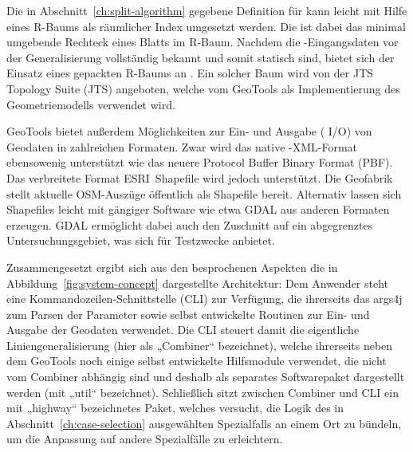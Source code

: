\documentclass[../main/thesis.tex]{subfiles}
\begin{document}
Die in Abschnitt~\ref{ch:split-algorithm} gegebene Definition für  kann leicht mit Hilfe eines R-Baums als räumlicher Index umgesetzt werden.
Die  ist dabei das minimal umgebende Rechteck eines Blatts im R-Baum.
Nachdem die \osm-Eingangsdaten vor der Generalisierung vollständig bekannt und somit statisch sind, bietet sich der Einsatz eines gepackten R-Baums an .
Ein solcher Baum wird von der JTS Topology Suite (JTS) angeboten, welche vom  GeoTools als Implementierung des Geometriemodells verwendet wird.

GeoTools bietet außerdem Möglichkeiten zur Ein- und Ausgabe ( I/O) von Geodaten in zahlreichen Formaten.
Zwar wird das native \osm-XML-Format ebensowenig unterstützt wie das neuere Protocol Buffer Binary Format (PBF).
Das verbreitete Format ESRI~Shapefile wird jedoch unterstützt.
Die Geofabrik stellt aktuelle OSM-Auszüge öffentlich als Shapefile bereit.
Alternativ lassen sich Shapefiles leicht mit gängiger Software wie etwa GDAL aus anderen Formaten erzeugen.
GDAL ermöglicht dabei auch den Zuschnitt auf ein abgegrenztes Untersuchungsgebiet, was sich für Testzwecke anbietet.


Zusammengesetzt ergibt sich aus den besprochenen Aspekten die in Abbildung~\ref{fig:system-concept} dargestellte Architektur:
Dem Anwender steht eine Kommandozeilen-Schnittstelle (CLI) zur Verfügung, die ihrerseits das  args4j zum Parsen der Parameter sowie selbst entwickelte Routinen zur Ein- und Ausgabe der Geodaten verwendet.
Die CLI steuert damit die eigentliche Liniengeneralisierung (hier als „Combiner“ bezeichnet), welche ihrerseits neben dem  GeoTools noch einige selbst entwickelte Hilfsmodule verwendet, die nicht vom Combiner abhängig sind und deshalb als separates Softwarepaket dargestellt werden (mit „util“ bezeichnet).
Schließlich sitzt zwischen Combiner und CLI ein mit „highway“ bezeichnetes Paket, welches versucht, die Logik des in Abschnitt~\ref{ch:case-selection} ausgewählten Spezialfalls an einem Ort zu bündeln, um die Anpassung auf andere Spezialfälle zu erleichtern.
\end{document}
